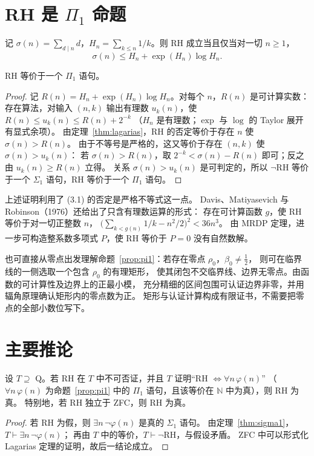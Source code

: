 \documentclass[11pt]{article}
\begin{document}
\section{\texorpdfstring{RH 是 $\Pi_1$ 命题}{RH 是 Pi-1 命题}}
\begin{theorem}[Lagarias 2002，引用]\label{thm:lagarias}
记 $\sigma(n)=\sum_{d\mid n}d$，$H_n=\sum_{k\le n}1/k$。则 RH 成立当且仅当对一切 $n\ge1$，
\[
 \sigma(n)\le H_n+\exp(H_n)\log H_n .                    \tag{3.1}
\]
\end{theorem}
\begin{proposition}\label{prop:pi1}
RH 等价于一个 $\Pi_1$ 语句。
\end{proposition}
\begin{proof}
记 $R(n)=H_n+\exp(H_n)\log H_n$。对每个 $n$，$R(n)$ 是可计算实数：
存在算法，对输入 $(n,k)$ 输出有理数 $u_k(n)$，使 $R(n)\le u_k(n)\le R(n)+2^{-k}$
（$H_n$ 是有理数；$\exp$ 与 $\log$ 的 Taylor 展开有显式余项）。
由定理~\ref{thm:lagarias}，RH 的否定等价于存在 $n$ 使 $\sigma(n)>R(n)$。
由于不等号是严格的，这又等价于存在 $(n,k)$ 使 $\sigma(n)>u_k(n)$：
若 $\sigma(n)>R(n)$，取 $2^{-k}<\sigma(n)-R(n)$ 即可；反之由 $u_k(n)\ge R(n)$ 立得。
关系 $\sigma(n)>u_k(n)$ 是可判定的，所以 $\neg$RH 等价于一个 $\Sigma_1$ 语句，RH 等价于一个 $\Pi_1$ 语句。
\end{proof}

上述证明利用了 (3.1) 的否定是严格不等式这一点。
Davis、Matiyasevich 与 Robinson（1976）还给出了只含有理数运算的形式：
存在可计算函数 $g$，使 RH 等价于对一切正整数 $n$，
$\bigl(\sum_{k<g(n)}1/k-n^2/2\bigr)^2<36n^3$。
由 MRDP 定理，进一步可构造整系数多项式 $P$，使 RH 等价于 $P=0$ 没有自然数解。

也可直接从零点出发理解命题~\ref{prop:pi1}：若存在零点 $\rho_0$，$\beta_0\ne\tfrac12$，
则可在临界线的一侧选取一个包含 $\rho_0$ 的有理矩形，
使其闭包不交临界线、边界无零点。由函数的可计算性及边界上的正最小模，
充分精细的区间包围可认证边界非零，并用辐角原理确认矩形内的零点数为正。
矩形与认证计算构成有限证书，不需要把零点的全部小数位写下。

\section{主要推论}
\begin{proposition}\label{prop:indep}
设 $T\supseteq$ Q。若 RH 在 $T$ 中不可否证，并且 $T$ 证明“RH $\Leftrightarrow\forall n\,\varphi(n)$”
（$\forall n\,\varphi(n)$ 为命题~\ref{prop:pi1} 中的 $\Pi_1$ 语句，且该等价在 $\mathbb N$ 中为真），则 RH 为真。
特别地，若 RH 独立于 ZFC，则 RH 为真。
\end{proposition}
\begin{proof}
若 RH 为假，则 $\exists n\,\neg\varphi(n)$ 是真的 $\Sigma_1$ 语句。
由定理~\ref{thm:sigma1}，$T\vdash\exists n\,\neg\varphi(n)$；
再由 $T$ 中的等价，$T\vdash\neg$RH，与假设矛盾。
ZFC 中可以形式化 Lagarias 定理的证明，故后一结论成立。
\end{proof}
\end{document}
